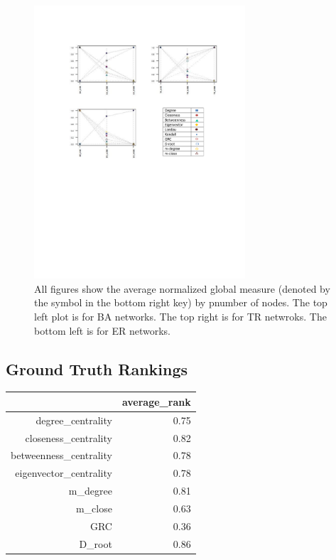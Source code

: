 \documentclass[3p,times]{elsarticle}
\begin{document}
\begin{figure}
	\begin{center}
	\caption{\label{fig::Simulated Size} All figures show the average normalized global measure (denoted by the symbol in the bottom right key) by pnumber of nodes. The top left plot is for BA networks. The top right is for TR netwroks. The bottom left is for ER networks.}
	\includegraphics[width = 0.70\textwidth]{./images/Norm_Size.pdf}
	\end{center}
\end{figure}



\subsection{Ground Truth Rankings}
\begin{table}[ht]
\centering
\begin{tabular}{rr}
  \hline
 & average\_rank \\ 
  \hline
degree\_centrality & 0.75 \\ 
  closeness\_centrality & 0.82 \\ 
  betweenness\_centrality & 0.78 \\ 
  eigenvector\_centrality & 0.78 \\ 
  m\_degree & 0.81 \\ 
  m\_close & 0.63 \\ 
  GRC & 0.36 \\ 
  D\_root & 0.86 \\ 
   \hline
\end{tabular}
\end{table}
\end{document}
